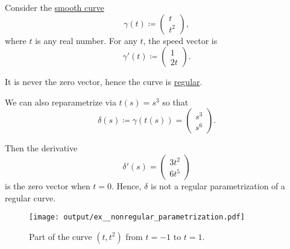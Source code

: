 \begin{example}\label{ex:nonregular_parametrization}
  Consider the \hyperref[def:smooth_curve]{smooth curve}
  \begin{equation*}
    \gamma(t)
    \coloneqq
    \begin{pmatrix}
      t \\ t^2
    \end{pmatrix},
  \end{equation*}
  where \( t \) is any real number. For any \( t \), the speed vector is
  \begin{equation*}
    \gamma'(t)
    \coloneqq
    \begin{pmatrix}
      1 \\ 2t
    \end{pmatrix}.
  \end{equation*}

  It is never the zero vector, hence the curve is \hyperref[def:regular_curve]{regular}.

  We can also reparametrize via \( t(s) = s^3 \) so that
  \begin{equation*}
    \delta(s)
    \coloneqq
    \gamma(t(s))
    =
    \begin{pmatrix}
      s^3 \\ s^6
    \end{pmatrix}.
  \end{equation*}

  Then the derivative
  \begin{equation*}
    \delta'(s)
    =
    \begin{pmatrix}
      3t^2 \\ 6t^5
    \end{pmatrix}
  \end{equation*}
  is the zero vector when \( t = 0 \). Hence, \( \delta \) is not a regular parametrization of a regular curve.

  \begin{figure}[!ht]
    \centering
    \texttt{[image: output/ex\_\_nonregular\_parametrization.pdf]}
    \caption{Part of the curve \( (t, t^2) \) from \( t = -1 \) to \( t = 1 \).}\label{fig:ex:nonregular_parametrization}
  \end{figure}
\end{example}


